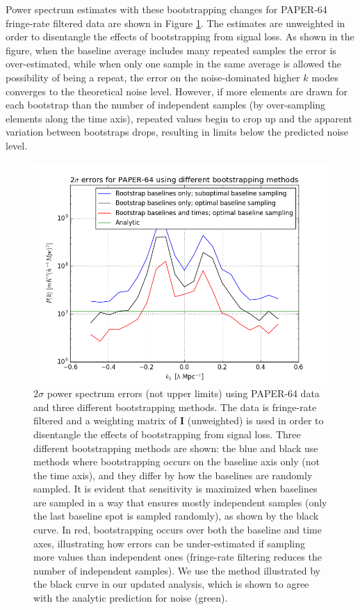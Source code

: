 \documentclass[preprint2,numberedappendix,tighten]{aastex6}  %
\begin{document}
Power spectrum estimates with these bootstrapping changes for PAPER-64 fringe-rate filtered data are shown in Figure \ref{fig:data_errors}. The estimates are unweighted in order to disentangle the effects of bootstrapping from signal loss. As shown in the figure, when the baseline average includes many repeated samples the error is over-estimated, while when only one sample in the same average is allowed the possibility of being a repeat, the error on the noise-dominated higher $k$ modes converges to the theoretical noise level.  However, if more elements are drawn for each bootstrap than the number of independent samples (by over-sampling elements along the time axis), repeated values begin to crop up and the apparent variation between bootstraps drops, resulting in limits below the predicted noise level.

\begin{figure}
	\centering
	\includegraphics[trim={0.3cm 0.3cm 0.3cm 0.3cm},width=\columnwidth]{plots/data_errors.png}
	\caption{$2\sigma$ power spectrum errors (not upper limits) using PAPER-64 data and three different bootstrapping methods. The data is fringe-rate filtered and a weighting matrix of $\textbf{I}$ (unweighted) is used in order to disentangle the effects of bootstrapping from signal loss. Three different bootstrapping methods are shown: the blue and black use methods where bootstrapping occurs on the baseline axis only (not the time axis), and they differ by how the baselines are randomly sampled. It is evident that sensitivity is maximized when baselines are sampled in a way that ensures mostly independent samples (only the last baseline spot is sampled randomly), as shown by the black curve. In red, bootstrapping occurs over both the baseline and time axes, illustrating how errors can be under-estimated if sampling more values than independent ones (fringe-rate filtering reduces the number of independent samples). We use the method illustrated by the black curve in our updated analysis, which is shown to agree with the analytic prediction for noise (green).}
	\label{fig:data_errors}
\end{figure}
\end{document}
